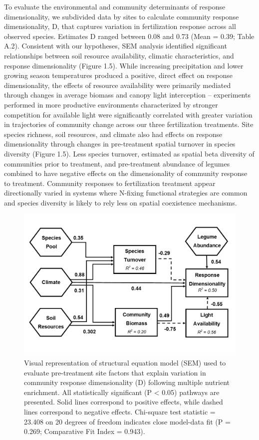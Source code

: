 \documentclass[twoside,12pt,final]{ucthesis-CA2012}
\begin{document}
\begin{ucmainmatter}
To evaluate the environmental and community determinants of response dimensionality, we subdivided data by sites to calculate community response dimensionality, D, that captures variation in fertilization response across all observed species. Estimates D ranged between 0.08 and 0.73 (Mean = 0.39; Table A.2).
Consistent with our hypotheses, SEM analysis identified significant relationships between soil resource availability, climatic characteristics, and response dimensionality (Figure 1.5). While increasing precipitation and lower growing season temperatures produced a positive, direct effect on response dimensionality, the effects of resource availability were primarily mediated through changes in average biomass and canopy light interception -- experiments performed in more productive environments characterized by stronger competition for available light were significantly correlated with greater variation in trajectories of community change across our three fertilization treatments.
Site species richness, soil resources, and climate also had effects on response dimensionality through changes in pre-treatment spatial turnover in species diversity (Figure 1.5). Less species turnover, estimated as spatial beta diversity of communities prior to treatment, and pre-treatment abundance of legumes combined to have negative effects on the dimensionality of community response to treatment. Community responses to fertilization treatment appear directionally varied in systems where N-fixing functional strategies are common and species diversity is likely to rely less on spatial coexistence mechanisms.
\begin{figure}
\centering
\includegraphics[width=\textwidth,height=0.5\textheight]{figure/Fig1_5.png}
\caption{Visual representation of structural equation model (SEM) used to evaluate pre-treatment site factors that explain variation in community response dimensionality (D) following multiple nutrient enrichment. All statistically significant (P \textless{} 0.05) pathways are presented. Solid lines correspond to positive effects, while dashed lines correspond to negative effects. Chi-square test statistic = 23.408 on 20 degrees of freedom indicates close model-data fit (P = 0.269; Comparative Fit Index = 0.943). \label{fig-1-5}}
\end{figure}
\hypertarget{discussion}{%
}
\end{ucmainmatter}
\end{document}

